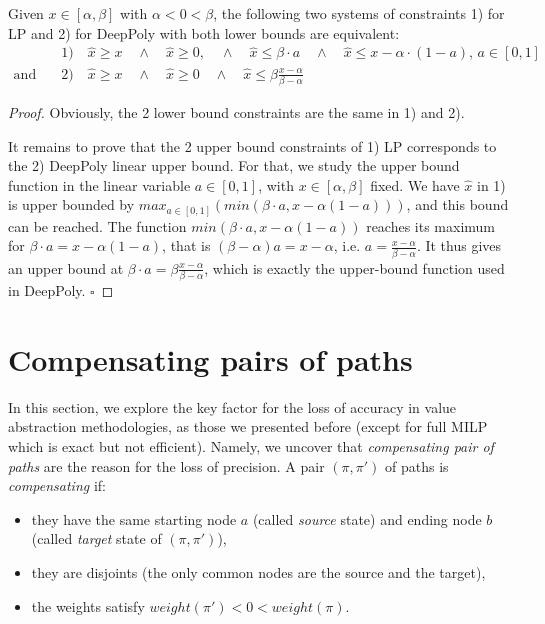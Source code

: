 \documentclass{llncs}
\begin{document}
\begin{proposition}
	\label{LP}
 Given $x \in [\alpha,\beta]$ with $\alpha < 0 < \beta$, the following two systems of constraints 
 1) for LP and 2) for DeepPoly with both lower bounds are equivalent:
 \vspace{-0.3cm}
 \begin{align*}
	 & 1) \quad \hat{x} \geq x \quad \wedge \quad \hat{x} \geq 0, \quad \wedge \quad \hat{x} \leq \beta \cdot a \quad \wedge \quad \hat{x} \leq x-\alpha \cdot (1-a), \, a \in [0,1] \\
	 \text{and} \quad  & 2)  \quad \hat{x} \geq x \quad \wedge \quad \hat{x} \geq 0 \quad \wedge \quad \hat{x} \leq \beta \frac{x-\alpha}{\beta-\alpha}
\end{align*} 
\end{proposition}

\begin{proof}
Obviously, the 2 lower bound constraints are the same in 1) and 2).

It remains to prove that the 2 upper bound constraints of 1) LP corresponds to the 2) DeepPoly linear upper bound. For that, we study the upper bound function in the linear variable $a \in  [0,1]$, with $x \in [\alpha,\beta]$ fixed. We have $\hat{x}$ in 1) is upper bounded by $max_{a \in [0,1]} (min(\beta \cdot a, x - \alpha (1-a)))$, and this bound can be reached. 
The function $min(\beta \cdot a, x - \alpha (1-a))$ reaches its maximum for 
$\beta \cdot a = x - \alpha (1-a)$, that is 
$(\beta - \alpha) a = x - \alpha$, i.e. 
$ a = \frac{x - \alpha}{\beta-\alpha}$.
It thus gives an upper bound at 
$\beta \cdot a = \beta \frac{x - \alpha}{\beta-\alpha}$, which is exactly the upper-bound function used in DeepPoly.
\hfill $\square$
\end{proof}







\section{Compensating pairs of paths}
\label{Sec.comp}

In this section, we explore the key factor for the loss of accuracy in value abstraction methodologies, as those we presented before (except for full MILP which is exact but 
not efficient). 
Namely, we uncover that \emph{compensating pair of paths} are the reason for the loss of precision. A pair $(\pi,\pi')$ of paths is {\em compensating} if:
\begin{itemize}
 \item they have the same starting node $a$ (called {\em source} state) and ending node $b$ (called {\em target} state of $(\pi,\pi')$),
 \item they are disjoints (the only common nodes are the source and the target),
 \item the weights satisfy $weight(\pi') < 0 < weight(\pi)$.
\end{itemize}
\end{document}
